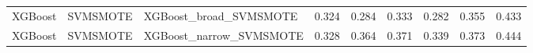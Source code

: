 \begin{tabular}{lllllllll}
                     XGBoost &            SVMSMOTE &                       XGBoost\_broad\_SVMSMOTE & 0.324 &                     0.284 &                 0.333 &                  0.282 &                                   0.355 &     0.433 \\
                     XGBoost &            SVMSMOTE &                      XGBoost\_narrow\_SVMSMOTE & 0.328 &                     0.364 &                 0.371 &                  0.339 &                                   0.373 &     0.444 \\
\bottomrule
\end{tabular}
